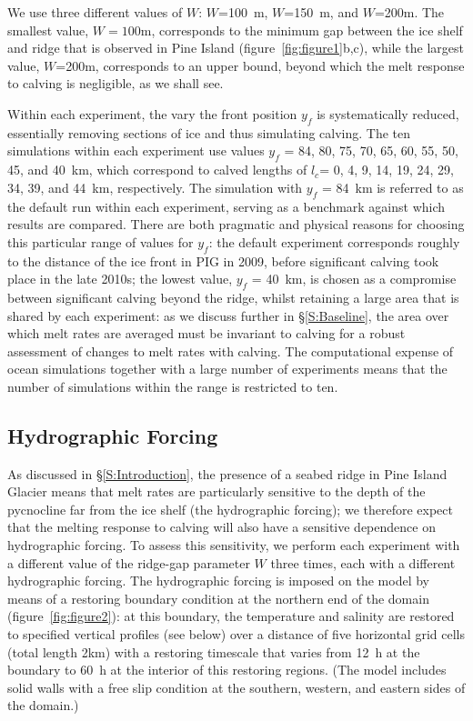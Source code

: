 \documentclass[draft]{agujournal2019}
\begin{document}
We use three different values of $W$: $W$=100~m, $W$=150~m, and $W$=200m. The smallest value, $W = 100$m, corresponds to the minimum gap between the ice shelf and ridge that is observed in Pine Island (figure~\ref{fig:figure1}b,c), while the largest value, $W$=200m, corresponds to an upper bound, beyond which the melt response to calving is negligible, as we shall see. 

Within each experiment, the vary the front position $y_f$ is systematically reduced, essentially removing sections of ice and thus simulating calving. The ten simulations within each experiment use values $y_f$ = 84, 80, 75, 70, 65, 60, 55, 50, 45, and 40~km, which correspond to calved lengths of $l_c$= 0, 4, 9, 14, 19, 24, 29, 34, 39, and 44~km, respectively. The simulation with $y_f$ = 84~km is referred to as the default run within each experiment, serving as a benchmark against which results are compared. There are both pragmatic and physical reasons for choosing this particular range of values for $y_f$: the default experiment corresponds roughly to the distance of the ice front in PIG in 2009, before significant calving took place in the late 2010s; the lowest value, $y_f$ = 40~km, is chosen as a compromise between significant calving beyond the ridge, whilst retaining a large area that is shared by each experiment: as we discuss further in \S\ref{S:Baseline}, the area over which melt rates are averaged must be invariant to calving for a robust assessment of changes to melt rates with calving. The computational expense of ocean simulations together with a large number of experiments means that the number of simulations within the range is restricted to ten.

\subsection{Hydrographic Forcing}\label{S:Experiment:Hydrography}

As discussed in \S\ref{S:Introduction}, the presence of a seabed ridge in Pine Island Glacier means that melt rates are particularly sensitive to the depth of the pycnocline far from the ice shelf (the hydrographic forcing); we therefore expect that the melting response to calving will also have a sensitive dependence on hydrographic forcing. To assess this sensitivity, we perform each experiment with a different value of the ridge-gap parameter $W$ three times, each with a different hydrographic forcing. The hydrographic forcing is  imposed on the model by means of a restoring boundary condition at the northern end of the domain (figure~\ref{fig:figure2}): at this boundary, the temperature and salinity are restored to specified vertical profiles (see below) over a distance of five horizontal grid cells (total length 2km) with a restoring timescale that varies from 12~h at the boundary to 60~h at the interior of this restoring regions. (The model includes solid walls with a free slip condition at the southern, western, and eastern sides of the domain.)
\end{document}
